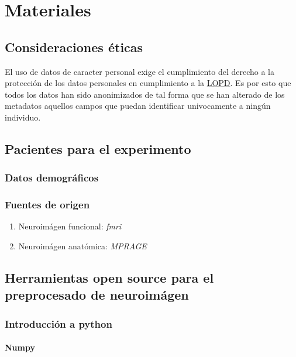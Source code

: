 \chapter{Materiales}

\section{Consideraciones éticas}

El uso de datos de caracter personal exige el cumplimiento del derecho a la protección de los datos personales en cumplimiento a la \hyperref[glos:lopd]{LOPD}. Es por esto que todos los datos han sido anonimizados de tal forma que se han alterado de los metadatos aquellos campos que puedan identificar univocamente a ningún individuo.

\section{Pacientes para el experimento}

\subsection{Datos demográficos}

\subsection{Fuentes de origen}

\begin{enumerate}
\item Neuroimágen funcional: \textit{fmri}
\item Neuroimágen anatómica: \textit{MPRAGE}
\end{enumerate}

\section{Herramientas open source para el preprocesado de neuroimágen}

\subsection{Introducción a python}

\subsubsection{Numpy}
